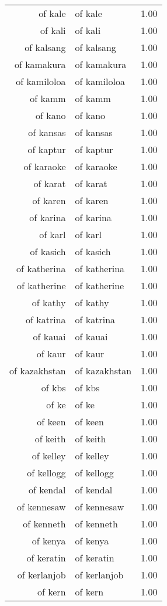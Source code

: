 \begin{table}[ht]
\begin{tabular}{rlr}
  of kale & of kale & 1.00 \\ 
  of kali & of kali & 1.00 \\ 
  of kalsang & of kalsang & 1.00 \\ 
  of kamakura & of kamakura & 1.00 \\ 
  of kamiloloa & of kamiloloa & 1.00 \\ 
  of kamm & of kamm & 1.00 \\ 
  of kano & of kano & 1.00 \\ 
  of kansas & of kansas & 1.00 \\ 
  of kaptur & of kaptur & 1.00 \\ 
  of karaoke & of karaoke & 1.00 \\ 
  of karat & of karat & 1.00 \\ 
  of karen & of karen & 1.00 \\ 
  of karina & of karina & 1.00 \\ 
  of karl & of karl & 1.00 \\ 
  of kasich & of kasich & 1.00 \\ 
  of katherina & of katherina & 1.00 \\ 
  of katherine & of katherine & 1.00 \\ 
  of kathy & of kathy & 1.00 \\ 
  of katrina & of katrina & 1.00 \\ 
  of kauai & of kauai & 1.00 \\ 
  of kaur & of kaur & 1.00 \\ 
  of kazakhstan & of kazakhstan & 1.00 \\ 
  of kbs & of kbs & 1.00 \\ 
  of ke & of ke & 1.00 \\ 
  of keen & of keen & 1.00 \\ 
  of keith & of keith & 1.00 \\ 
  of kelley & of kelley & 1.00 \\ 
  of kellogg & of kellogg & 1.00 \\ 
  of kendal & of kendal & 1.00 \\ 
  of kennesaw & of kennesaw & 1.00 \\ 
  of kenneth & of kenneth & 1.00 \\ 
  of kenya & of kenya & 1.00 \\ 
  of keratin & of keratin & 1.00 \\ 
  of kerlanjob & of kerlanjob & 1.00 \\ 
  of kern & of kern & 1.00 \\ 

\end{tabular}
\end{table}
